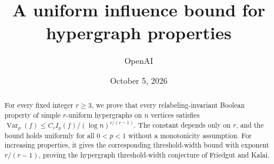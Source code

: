 \documentclass[11pt]{article}
\title{A uniform influence bound for hypergraph properties}
\author{OpenAI}
\date{October 5, 2026}
\DeclareMathOperator{\Var}{Var}
\theoremstyle{remark}
\numberwithin{equation}{section}
\begin{document}
\maketitle
\begin{abstract}
For every fixed integer $r\ge3$, we prove that every relabeling-invariant
Boolean property of simple $r$-uniform hypergraphs on $n$ vertices
satisfies
$\Var_p(f)\le C_r I_p(f)/(\log n)^{r/(r-1)}$.
The constant depends only on $r$, and the bound holds uniformly for all
$0<p<1$ without a monotonicity assumption. For increasing properties,
it gives the corresponding threshold-width bound with exponent
$r/(r-1)$, proving the hypergraph threshold-width conjecture of
Friedgut and Kalai.
\end{abstract}




\clearpage

\end{document}
